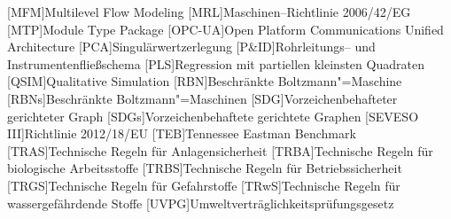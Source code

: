 \begin{acronym}[12. BImSchV]
  [MFM]{Multilevel Flow Modeling}
  [MRL]{Maschinen--Richtlinie 2006/42/EG}	
  [MTP]{Module Type Package}	
  [OPC-UA]{Open Platform Communications Unified Architecture}
  [PCA]{Singul\"arwertzerlegung }
	[P\&{}ID]{Rohrleitungs-- und Instrumentenflie\ss{}schema }	
	[PLS]{Regression mit partiellen kleinsten Quadraten }	
	[QSIM]{Qualitative Simulation }
	[RBN]{Beschr\"ankte Boltzmann"=Maschine }
	[RBNs]{Beschr\"ankte Boltzmann"=Maschinen }
	[SDG]{Vorzeichenbehafteter gerichteter Graph }
	[SDGs]{Vorzeichenbehaftete gerichtete Graphen}
	[SEVESO III]{Richtlinie 2012/18/EU}
	[TEB]{Tennessee Eastman Benchmark}
	[TRAS]{Technische Regeln f\"ur Anlagensicherheit}
	[TRBA]{Technische Regeln f\"ur biologische Arbeitsstoffe}
	[TRBS]{Technische Regeln f\"ur Betriebssicherheit}
	[TRGS]{Technische Regeln f\"ur Gefahrstoffe}
	[TRwS]{Technische Regeln f\"ur wassergef\"ahrdende Stoffe}
	[UVPG]{Umweltvertr\"aglichkeitspr\"ufungsgesetz}
\end{acronym}